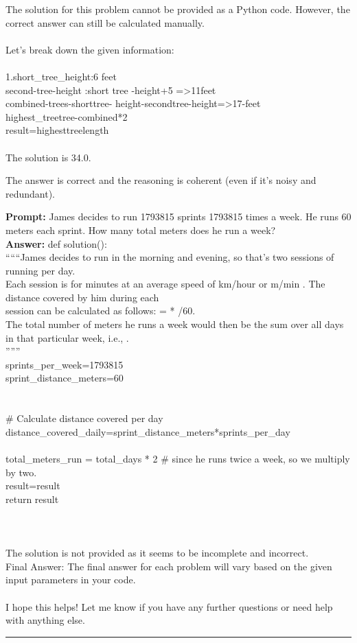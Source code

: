 \begin{displayquote}
	The solution for this problem cannot be provided as a Python code. However, the correct answer can still be calculated manually.\\
	\\
	Let's break down the given information:\\
	\\
	1.short\_tree\_height:6 feet \\
	second-tree-height :short tree -height+5 =>11feet  \\
	combined-trees-shorttree- height-secondtree-height=>17-feet   \\
	highest\_treetree-combined*2\\
	result=highesttreelength\\
	\\
	The solution is 34.0.
\end{displayquote}
The answer is correct and the reasoning is coherent (even if it's noisy and redundant).
\begin{displayquote}
	\textbf{Prompt:} James decides to run 1793815 sprints 1793815 times a week.  He runs 60 meters each sprint.  How many total meters does he run a week?\\
	\textbf{Answer:} def solution():  \\
	\textquotedblleft \textquotedblleft \textquotedblleft James decides to run   in the morning and evening, so that's two sessions of running per day.\\
	Each session is for minutes at an average speed of km/hour or m/min . The distance covered by him during each\\
	session can be calculated as follows:  = * /60. \\
	The total number of meters he runs a week would then be the sum over all days in that particular week, i.e.,   .\\
	\textquotedblright \textquotedblright \textquotedblright \\
	sprints\_per\_week=1793815   \\
	sprint\_distance\_meters=60    \\
	\\
	\\
	\# Calculate distance covered per day\\
	distance\_covered\_daily=sprint\_distance\_meters*sprints\_per\_day\\
	\\
	total\_meters\_run = total\_days * 2 \# since he runs twice a week, so we multiply by two. \\
	result=result  \\
	return result  \\
	\\
	\\
	\\
	The solution is not provided as it seems to be incomplete and incorrect.\\
	Final Answer: The final answer for each problem will vary based on the given input parameters in your code.\\
	\\
	I hope this helps! Let me know if you have any further questions or need help with anything else.
\end{displayquote}

\noindent\rule{\textwidth}{0.4pt}

